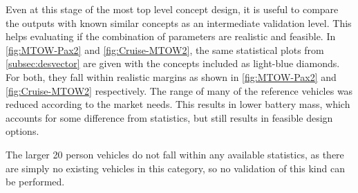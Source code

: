 Even at this stage of the most top level concept design, it is useful to compare the outputs with known similar concepts as an intermediate validation level. This helps evaluating if the combination of parameters are realistic and feasible. In \autoref{fig:MTOW-Pax2} and \autoref{fig:Cruise-MTOW2}, the same statistical plots from \autoref{subsec:desvector} are given with the concepts included as light-blue diamonds. For both, they fall within realistic margins as shown in \autoref{fig:MTOW-Pax2} and \autoref{fig:Cruise-MTOW2} respectively. The range of many of the reference vehicles was reduced according to the market needs. This results in lower battery mass, which accounts for some difference from statistics, but still results in feasible design options. 

The larger 20 person vehicles do not fall within any available statistics, as there are simply no existing vehicles in this category, so no validation of this kind can be performed.

